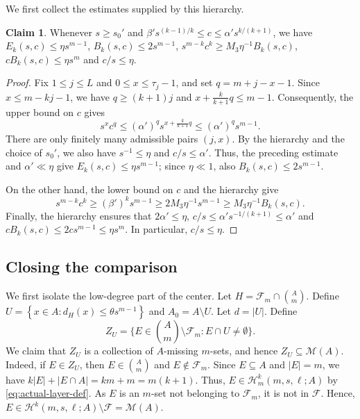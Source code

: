 \documentclass[10pt,a4paper]{article}
\numberwithin{equation}{section}
\theoremstyle{definition}
\newtheorem{claim}[claim]{Claim}
\newcommand{\F}{\mathcal F}
\newcommand{\M}{\mathcal M}
\begin{document}
We first collect the estimates supplied by this hierarchy.

\begin{claim}\label{cl:window-estimates}
        Whenever $s\ge s_0'$ and
        $\beta's^{(k-1)/k}\le c\le \alpha's^{k/(k+1)}$, we have $E_k(s,c)\le\eta s^{m-1}$, $B_k(s,c)\le2s^{m-1}$, $s^{m-k}c^k\ge M_3\eta^{-1}B_k(s,c)$, $cB_k(s,c)\le\eta s^m$ and $c/s\le \eta$.
\end{claim}

\begin{proof}
        Fix $1\le j\le L$ and $0\le x\le\tau_j-1$, and set
        $q=m+j-x-1$.
        Since $x\le m-kj-1$, we have $q\ge(k+1)j$ and
        $x+\frac{k}{k+1}q\le m-1$.  Consequently, the upper bound on $c$
        gives
        \[
                s^xc^q
                \le
                (\alpha')^q s^{x+\frac{k}{k+1}q}
                \le
                (\alpha')^q s^{m-1}.
        \]
        There are only finitely many admissible pairs $(j,x)$.  By the
        hierarchy and the choice of $s_0'$, we also have $s^{-1}\le\eta$
        and $c/s\le\alpha'$.  Thus, the preceding estimate and
        $\alpha'\ll\eta$ give $E_k(s,c)\le\eta s^{m-1}$; since
        $\eta\ll1$, also $B_k(s,c)\le2s^{m-1}$.

        On the other hand, the lower bound on $c$ and the hierarchy give
        \[
                s^{m-k}c^k
                \ge (\beta')^k s^{m-1}
                \ge 2M_3\eta^{-1}s^{m-1}
                \ge M_3\eta^{-1}B_k(s,c).
        \]
        Finally, the hierarchy ensures that $2\alpha'\le\eta$, $c/s\le\alpha's^{-1/(k+1)}\le\alpha'$ and $cB_k(s,c)\le2cs^{m-1}\le\eta s^m$.
        In particular, $c/s\le\eta$.
\end{proof}


\subsection{Closing the comparison}

We first isolate the low-degree part of the center.
Let $H=\F_m\cap\binom Am$.
Define $U=\left\{x\in A:d_H(x)\le \theta s^{m-1}\right\}$ and $A_0=A\setminus U$.
Let $d=|U|$.
Define
\begin{equation}\label{eq:defect-ZU-definition}
        Z_U=\{E\in\binom Am\setminus\F_m:E\cap U\ne\emptyset\}.
\end{equation}
We claim that $Z_U$ is a collection of $A$-missing $m$-sets, and hence $Z_U\subseteq\M(A)$.
Indeed, if $E\in Z_U$, then $E\in\binom Am$ and $E\notin\F_m$.
Since $E\subseteq A$ and $|E|=m$, we have $k|E|+|E\cap A|=km+m=m(k+1)$.
Thus, $E\in\mathcal H^k_m(m,s,\ell;A)$ by \eqref{eq:actual-layer-def}.
As $E$ is an $m$-set not belonging to $\F_m$, it is not in $\F$.
Hence, $E\in\mathcal H^k(m,s,\ell;A)\setminus\F=\M(A)$.
\end{document}
